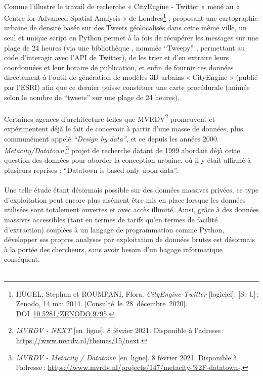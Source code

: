 \documentclass[
  11pt,
  french,
]{article}
\begin{document}
~\\
Comme l'illustre le travail de recherche « CityEngine - Twitter » mené
au « Centre for Advanced Spatial Analysis » de Londres\footnote{HÜGEL,
  Stephan et ROUMPANI, Flora. \emph{{CityEngine}-Twitter}
  {[}logiciel{]}. {[}S.~l.{]}\,: Zenodo, 14 mai 2014.
  {[}Consulté~le~28~décembre~2020{]}.
  DOI~\href{https://doi.org/10.5281/ZENODO.9795}{10.5281/ZENODO.9795}.}
, proposant une cartographie urbaine de densité basée sur des Tweets
géolocalisés dans cette même ville, un seul et unique script en Python
permet à la fois de récupérer les messages sur une plage de 24 heures
(via une bibliothèque , nommée ``Tweepy'' , permettant au code
d'interagir avec l'API de Twitter), de les trier et d'en extraire leurs
coordonnées et leur horaire de publication, et enfin de fournir ces
données directement à l'outil de génération de modèles 3D urbains «
CityEngine » (publié par l'ESRI) afin que ce dernier puisse constituer
une carte procédurale (animée selon le nombre de ``tweets'' sur une
plage de 24 heures).\\
~\\
Certaines agences d'architecture telles que MVRDV\footnote{\emph{MVRDV -
  NEXT} {[}en~ligne{]}. 8 février 2021. Disponible à l'adresse\,:
  \url{https://www.mvrdv.nl/themes/15/next}.} promeuvent et
expérimentent déjà le fait de concevoir à partir d'une masse de données,
plus communément appelé \emph{``Design by data''}, et ce depuis les
années 2000. \emph{Metacity/Datatown},\footnote{\emph{MVRDV - Metacity /
  Datatown} {[}en~ligne{]}. 8 février 2021. Disponible à l'adresse\,:
  \url{https://www.mvrdv.nl/projects/147/metacity-\%2F-datatown-}.}
projet de recherche datant de 1999 abordait déjà cette question des
données pour aborder la conception urbaine, où il y était affirmé à
plusieurs reprises : ``Datatown is based only upon data''.\\
~\\
Une telle étude étant désormais possible sur des données massives
privées, ce type d'exploitation peut encore plus aisément être mis en
place lorsque les données utilisées sont totalement ouvertes et avec
accès illimité. Ainsi, grâce à des données massives accessibles (tant en
termes de tarifs qu'en termes de facilité d'extraction) couplées à un
langage de programmation comme Python, développer ses propres analyses
par exploitation de données brutes est désormais à la portée des
chercheurs, sans avoir besoin d'un bagage informatique conséquent.\\
~\\
\end{document}

